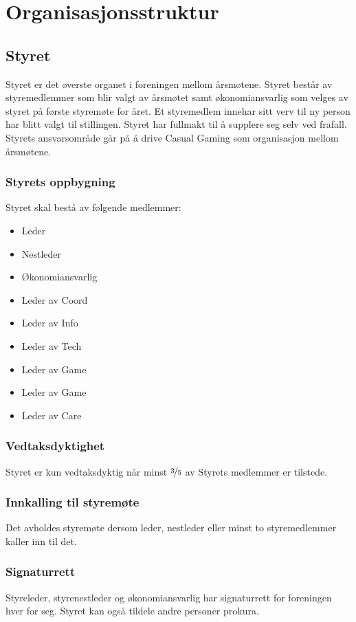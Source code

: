 \chapter{Organisasjonsstruktur}

\section{Styret}
Styret er det øverste organet i foreningen mellom årsmøtene. Styret består av styremedlemmer som blir valgt av årsmøtet samt økonomiansvarlig som velges av styret på første styremøte for året. Et styremedlem innehar sitt verv til ny person har blitt valgt til stillingen. Styret har fullmakt til å supplere seg selv ved frafall. Styrets ansvarsområde går på å drive Casual Gaming som organisasjon mellom årsmøtene.

\subsection{Styrets oppbygning}
Styret skal bestå av følgende medlemmer:
\begin{itemize}
    \item Leder
    \item Nestleder
    \item Økonomiansvarlig
    \item Leder av Coord
    \item Leder av Info
    \item Leder av Tech
    \item Leder av Game
    \item Leder av Game
    \item Leder av Care
\end{itemize}

\subsection{Vedtaksdyktighet}
Styret er kun vedtaksdyktig når minst $\nicefrac{3}{5}$ av Styrets medlemmer er tilstede.

\subsection{Innkalling til styremøte}
Det avholdes styremøte dersom leder, nestleder eller minst to styremedlemmer kaller inn til det.

\subsection{Signaturrett}
Styreleder, styrenestleder og økonomiansvarlig har signaturrett for foreningen hver for seg. Styret kan også tildele andre personer prokura.

